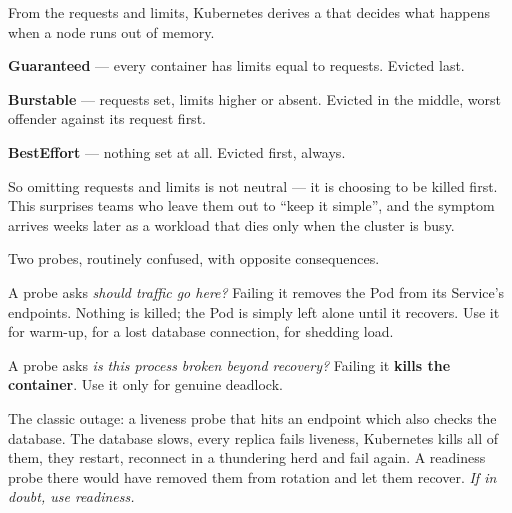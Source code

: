 \begin{conceptbox}
From the requests and limits, Kubernetes derives a  that
decides what happens when a node runs out of memory.

\begin{tight}
  \item \textbf{Guaranteed} --- every container has limits equal to requests.
        Evicted last.
  \item \textbf{Burstable} --- requests set, limits higher or absent. Evicted
        in the middle, worst offender against its request first.
  \item \textbf{BestEffort} --- nothing set at all. Evicted first, always.
\end{tight}

\smallskip
So omitting requests and limits is not neutral --- it is choosing to be killed
first. This surprises teams who leave them out to ``keep it simple'', and the
symptom arrives weeks later as a workload that dies only when the cluster is
busy.
\end{conceptbox}

\begin{conceptbox}
Two probes, routinely confused, with opposite consequences.

\smallskip
A  probe asks \emph{should traffic go here?} Failing it removes
the Pod from its Service's endpoints. Nothing is killed; the Pod is simply left
alone until it recovers. Use it for warm-up, for a lost database connection,
for shedding load.

\smallskip
A  probe asks \emph{is this process broken beyond recovery?}
Failing it \textbf{kills the container}. Use it only for genuine deadlock.

\smallskip
The classic outage: a liveness probe that hits an endpoint which also checks
the database. The database slows, every replica fails liveness, Kubernetes
kills all of them, they restart, reconnect in a thundering herd and fail again.
A readiness probe there would have removed them from rotation and let them
recover. \emph{If in doubt, use readiness.}
\end{conceptbox}

